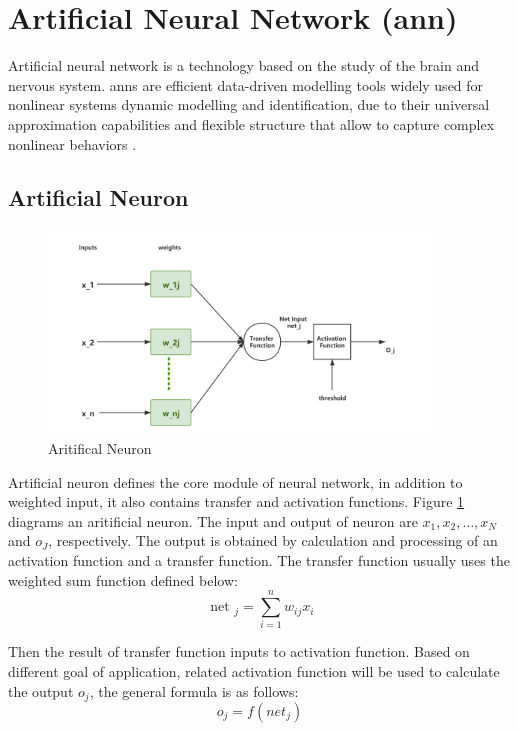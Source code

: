 \section{Artificial Neural Network (\gls{ann})}
Artificial neural network is a technology based on the study of the brain and nervous system\parencite{WALCZAK2003631}. \gls{ann}s are efficient data-driven modelling tools widely used for nonlinear systems dynamic modelling and identification, due to their universal approximation capabilities and flexible structure that allow to capture complex nonlinear behaviors \parencite{SHOKRY2018265}. 

\subsection{Artificial Neuron}


\begin{figure}[htbp]
\centering
\includegraphics[width=0.9\textwidth]{./images/neuron.png}
\caption{Aritifical Neuron}
\label{fig:neuron}
\end{figure}
Artificial neuron defines the core module of neural network, in addition to weighted input, it also contains transfer and activation functions. Figure \ref{fig:neuron} diagrams an aritificial neuron. The input and output of neuron are $x_1, x_2, \dots, x_N$ and $o_J$, respectively. The output is obtained by calculation and processing of an activation function and a transfer function. The transfer function usually uses the weighted sum function defined below:
\begin{equation}
\text { net }_{j}=\sum_{i=1}^{n} w_{i j} x_{i}
\end{equation}

Then the result of transfer function inputs to activation function. Based on different goal of application, related activation function will be used to calculate the output $o_j$, the general formula is as follows:
\begin{equation}
o_j = f(net_j)
\end{equation}

